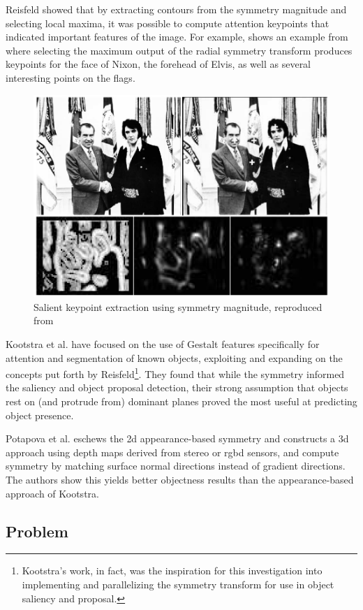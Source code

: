 Reisfeld showed that by extracting contours from the symmetry magnitude and selecting local maxima, it was possible to compute attention keypoints that indicated important features of the image. For example,  shows an example from \cite{reisfeld_context_1995} where selecting the maximum output of the radial symmetry transform produces keypoints for the face of Nixon, the forehead of Elvis, as well as several interesting points on the flags.

\begin{figure}[htbp]
\centering
\includegraphics[width=0.5\linewidth]{Introduction/elvis.png}
\caption{\label{fig:salient}
Salient keypoint extraction using symmetry magnitude, reproduced from }
\end{figure}

Kootstra et al. have focused on the use of Gestalt features specifically for attention and segmentation of known objects\cite{kootstra_using_2010,kootstra_gestalt_2011}, exploiting and expanding on the concepts put forth by Reisfeld\footnote{Kootstra's work, in fact, was the inspiration for this investigation into implementing and parallelizing the symmetry transform for use in object saliency and proposal.}. They found that while the symmetry informed the saliency and object proposal detection, their strong assumption that objects rest on (and protrude from) dominant planes proved the most useful at predicting object presence. 

Potapova et al.\cite{potapova_local_2012} eschews the \gls{2d} appearance-based symmetry and constructs a \gls{3d} approach using depth maps derived from stereo or \gls{rgbd} sensors, and compute symmetry by matching surface normal directions instead of gradient directions. The authors show this yields better objectness results than the appearance-based approach of Kootstra.

\subsection{Problem}
\label{sec:problem}

